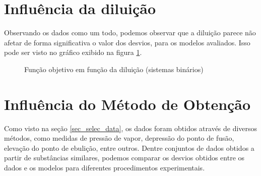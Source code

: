 \documentclass[
	12pt,				%
	openright,
	twoside,
	a4paper,			%
	english,			%
	french,				%
	spanish,			%
	brazil				%
	]{abntex2}
\begin{document}
\section{Influência da diluição}

Observando os dados como um todo, podemos observar que a diluição parece não
afetar de forma significativa o valor dos desvios, para os modelos avaliados.
Isso pode ser visto no gráfico exibido na figura \ref{fig_dilution_all}.

\begin{figure}[h]
	\centering
	\caption{Função objetivo em função da diluição (sistemas binários)}
	\label{fig_dilution_all}
\end{figure}

\section{Influência do Método de Obtenção}

Como visto na seção \ref{sec_selec_data}, os dados foram obtidos através de
diversos métodos, como medidas de pressão de vapor, depressão do ponto de fusão,
elevação do ponto de ebulição, entre outros. Dentre conjuntos de dados obtidos
a partir de substâncias similares, podemos comparar os desvios obtidos entre os
dados e os modelos para diferentes procedimentos experimentais.
\end{document}
